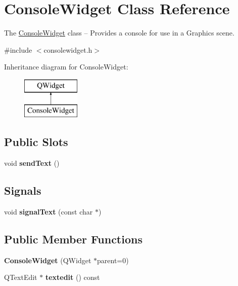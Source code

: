 \hypertarget{class_console_widget}{}\section{Console\+Widget Class Reference}
\label{class_console_widget}


The \hyperlink{class_console_widget}{Console\+Widget} class -- Provides a console for use in a Graphics scene.  




{\ttfamily \#include $<$consolewidget.\+h$>$}

Inheritance diagram for Console\+Widget\+:\begin{figure}[H]
\begin{center}
\leavevmode
\includegraphics[height=2.000000cm]{class_console_widget}
\end{center}
\end{figure}
\subsection*{Public Slots}
\begin{DoxyCompactItemize}
\item 
\mbox{\label{class_console_widget_a25c9db0a82f572647288b738f1b1781d}} 
void {\bfseries send\+Text} ()
\end{DoxyCompactItemize}
\subsection*{Signals}
\begin{DoxyCompactItemize}
\item 
\mbox{\label{class_console_widget_a5ff85011eea230aefe8633b329d5132f}} 
void {\bfseries signal\+Text} (const char $\ast$)
\end{DoxyCompactItemize}
\subsection*{Public Member Functions}
\begin{DoxyCompactItemize}
\item 
\mbox{\label{class_console_widget_a4a66caaf3f7583a46ebe44a5c2221160}} 
{\bfseries Console\+Widget} (Q\+Widget $\ast$parent=0)
\item 
\mbox{\label{class_console_widget_a599f0a9577aa0f63e3aad3714de14925}} 
Q\+Text\+Edit $\ast$ {\bfseries textedit} () const
\end{DoxyCompactItemize}
